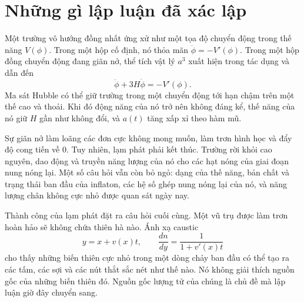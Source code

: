 \section{Những gì lập luận đã xác lập}

Một trường vô hướng đồng nhất ứng xử như một tọa độ chuyển động trong thế năng \(V(\phi)\). Trong một hộp cố định, nó thỏa mãn \(\ddot\phi=-V'(\phi)\). Trong một hộp đồng chuyển động đang giãn nở, thể tích vật lý \(a^3\) xuất hiện trong tác dụng và dẫn đến
\[
\ddot\phi+3H\dot\phi=-V'(\phi).
\]
Ma sát Hubble có thể giữ trường trong một chuyển động tới hạn chậm trên một thế cao và thoải. Khi đó động năng của nó trở nên không đáng kể, thế năng của nó giữ \(H\) gần như không đổi, và \(a(t)\) tăng xấp xỉ theo hàm mũ.

Sự giãn nở làm loãng các đơn cực không mong muốn, làm trơn hình học và đẩy độ cong tiến về 0. Tuy nhiên, lạm phát phải kết thúc. Trường rời khỏi cao nguyên, dao động và truyền năng lượng của nó cho các hạt nóng của giai đoạn nung nóng lại. Một số câu hỏi vẫn còn bỏ ngỏ: dạng của thế năng, bản chất và trạng thái ban đầu của inflaton, các hệ số ghép nung nóng lại của nó, và năng lượng chân không cực nhỏ được quan sát ngày nay.

Thành công của lạm phát đặt ra câu hỏi cuối cùng. Một vũ trụ được làm trơn hoàn hảo sẽ không chứa thiên hà nào. Ánh xạ caustic
\[
y=x+v(x)t,
\qquad
\frac{dn}{dy}=\frac{1}{1+v'(x)t}
\]
cho thấy những biến thiên cực nhỏ trong một dòng chảy ban đầu có thể tạo ra các tấm, các sợi và các nút thắt sắc nét như thế nào. Nó không giải thích nguồn gốc của những biến thiên đó. Nguồn gốc lượng tử của chúng là chủ đề mà lập luận giờ đây chuyển sang.
